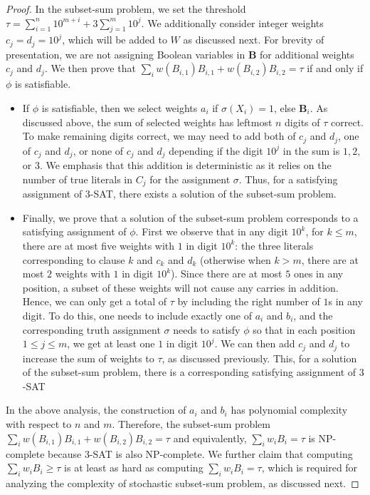 \begin{proof}
			In the subset-sum problem, we set the threshold $ \tau = \sum_{i=1}^n 10^{m+i} + 3 \sum_{j=1}^m 10^j $. We additionally consider integer weights $ c_j =  d_j = 10^j $, which will be added to $ W $ as discussed next. For brevity of presentation, we are not assigning Boolean variables in $\mathbf{B}$ for additional weights $ c_j $ and $ d_j $.
			 We then prove that  $ \sum_{i} w(B_{i,1})B_{i,1} + w(B_{i,2})B_{i,2} = \tau $ if and only if $ \phi $ is satisfiable. 
			
			\begin{itemize}
				\item If $ \phi $ is satisfiable, then we select weights $  a _i $ if $ \sigma(X_i) = 1 $, else $ \mathbf{B}_i $. As discussed above, the sum of selected weights has leftmost $ n $ digits of $ \tau $ correct. To make remaining digits correct, we may need to add both of $ c_j $ and $ d_j $, one of $ c_j $ and $ d_j $, or none of $ c_j $ and $ d_j $ depending  if the digit $ 10^j $ in the sum is $ 1,2, $ or $ 3 $. We emphasis that this addition is deterministic as it relies on the number of true literals in $ C_j $ for the assignment $ \sigma $. Thus, for a satisfying assignment of $ 3 $-SAT, there exists a solution of the subset-sum problem. 
				
				\item Finally, we prove that a solution of the subset-sum problem corresponds to a satisfying assignment of $ \phi $.  First we observe that in any digit $ 10^k $, for $ k \le m $, there are at most five weights with $ 1 $ in digit $ 10^k $: the three literals corresponding to clause $ k $ and $ c_k $ and $ d_k $ (otherwise when $ k > m $, there are at most $ 2 $  weights with $ 1 $ in digit $ 10^k $).  Since there are at most $ 5 $ ones in any position, a subset of these weights will not cause any carries in addition. Hence, we can only get a total of $ \tau $ by including the right number of $ 1 $s in any digit. To do this, one needs to include exactly one of $ a_i $ and $ b_i $, and the corresponding truth assignment $ \sigma $ needs to satisfy $ \phi $ so that in each position $ 1 \le j \le m $, we get at least one $ 1 $ in digit $ 10^j $. We can then add $ c_j $ and $ d_j $ to increase the sum of weights to $ \tau $, as discussed previously. This, for a solution of the subset-sum problem, there is a corresponding satisfying assignment of $ 3 $-SAT
			\end{itemize}
		
		
			In the above analysis, the construction of $ a_i $ and $ b_i $ has polynomial complexity with respect to $ n $ and $ m $. Therefore, the subset-sum problem $ \sum_{i} w(B_{i,1})B_{i,1} + w(B_{i,2})B_{i,2} = \tau $ and equivalently, $ \sum_{i} w_iB_i = \tau $ is $ \mathrm{NP} $-complete because $ 3 $-SAT is also $ \mathrm{NP} $-complete. We further claim that computing $ \sum_{i} w_iB_i \ge \tau $ is at least as hard as computing $ \sum_{i} w_iB_i = \tau $, which is required for analyzing the complexity of stochastic subset-sum problem, as discussed next.
			

\end{proof}
